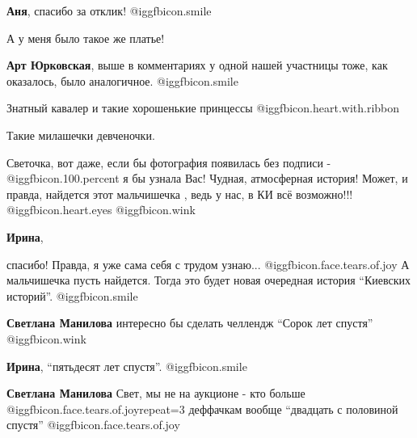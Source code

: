 \begin{itemize}
\textbf{Аня}, спасибо за отклик! @igg{fbicon.smile} 

А у меня было такое же платье!

\begin{itemize} %
\textbf{Арт Юрковская}, выше в комментариях у одной нашей участницы тоже, как оказалось, было аналогичное. @igg{fbicon.smile} 
\end{itemize} %

Знатный кавалер и такие хорошенькие принцессы @igg{fbicon.heart.with.ribbon} 

Такие милашечки девченочки.


Светочка, вот даже, если бы фотография появилась без подписи -  @igg{fbicon.100.percent}  я бы узнала
Вас! Чудная, атмосферная история! Может, и правда, найдется этот мальчишечка ,
ведь у нас, в КИ всё возможно!!! @igg{fbicon.heart.eyes}  @igg{fbicon.wink} 

\begin{itemize} %
\textbf{Ирина}, 

спасибо! Правда, я уже сама себя с трудом узнаю...
@igg{fbicon.face.tears.of.joy} А мальчишечка пусть найдется. Тогда это будет
новая очередная история \enquote{Киевских историй}. @igg{fbicon.smile} 

\textbf{Светлана Манилова} интересно бы сделать челлендж \enquote{Сорок лет спустя} @igg{fbicon.wink} 

\textbf{Ирина}, \enquote{пятьдесят лет спустя}. @igg{fbicon.smile} 

\textbf{Светлана Манилова} Свет, мы не на аукционе - кто больше @igg{fbicon.face.tears.of.joy}{repeat=3}  
деффачкам вообще \enquote{двадцать с половиной спустя} @igg{fbicon.face.tears.of.joy} 
\end{itemize} %

\end{itemize} %
